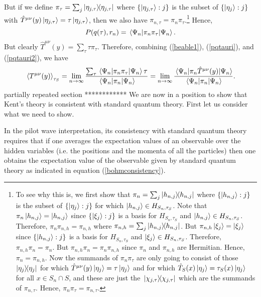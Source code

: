 But if we define $\pi_\tau=\sum_j\dyad{\eta_{j,\tau}}$ where $\{\ket{\eta_{j,\tau}}:j\}$ is the subset of  $\{\ket{\eta_j}:j\}$ with $\hat{T}^{\mu\nu}(y)\ket{\eta_{j,\tau}}=\tau\ket{\eta_{j,\tau}}$, then we also have  $\pi_{n,\tau}=\pi_n\pi_\tau$.\footnote{To see why this is, 
we first show that $\pi_n=\sum_j\dyad{h_{n,j}}$ where $\{\ket{h_{n,j}}:j\}$ is the subset of $\{\ket{\eta_j}:j\}$  for which $\ket{h_{n,j}}\in H_{S_n,\tau_S}$. 
Note that $\pi_n\ket{h_{n,j}}=\ket{h_{n,j}}$    since $\{\ket{\xi_j}:j\}$ is a basis for $H_{S_n,\tau_S}$ and $\ket{h_{n,j}}\in H_{S_n,\tau_S}$. 
Therefore, $\pi_n\pi_{n,h}=\pi_{n,h}$  where  $\pi_{n,h}=\sum_j\dyad{h_{n,j}}$. 
But  $\pi_{n,h}\ket{\xi_j}=\ket{\xi_j}$ since $\{\ket{h_{n,j}}:j\}$ is a basis for $H_{S_n,\tau_S}$ and $\ket{\xi_j}\in H_{S_n,\tau_S}$. 
Therefore, $\pi_{n,h}\pi_n=\pi_n.$ But $\pi_{n,h}\pi_n= \pi_n\pi_{n,h}$ since $\pi_n$ and $\pi_{n,h}$ are Hermitian. Hence, $\pi_n= \pi_{n,h}$. Now the summands of $\pi_n\pi_\tau$ are only going to consist of those $\dyad{\eta_j}$ for which $\hat{T}^{\mu\nu}(y)\ket{\eta_j}=\tau\ket{\eta_j}$ and for which $\hat{T}_S(x)\ket{\eta_j}=\tau_S(x)\ket{\eta_j}$ for all $x\in S_n\cap S$, and these are just the $\dyad*{\chi_{j,\tau}}$ which are the summands of  $\pi_{n,\tau}$. Hence,  $\pi_n\pi_\tau=\pi_{n,\tau}.$} 
  Hence,
\begin{equation}\label{pqtauri2}
P(q(\tau), r_n)=\ev*{\pi_n\pi_\tau}{\Psi_n}.
\end{equation}
But clearly $\hat{T}^{\mu\nu}(y)=\sum_\tau \tau \pi_\tau.$ Therefore, combining (\ref{beable1}), (\ref{pqtauri}), and (\ref{pqtauri2}), we have 
\begin{equation}\label{kentconsistency0}
\ev*{T^{\mu\nu}(y)}_{\tau_S}=\lim_{n\rightarrow\infty}\frac{\sum_\tau \ev*{\pi_n\pi_\tau}{\Psi_n}\tau}{\ev*{\pi_n}{\Psi_n}}=\lim_{n\rightarrow\infty}\frac{\ev*{\pi_n\hat{T}^{\mu\nu}(y)}{\Psi_n}}{\ev*{\pi_n}{\Psi_n}}.
\end{equation}
partially repeated section
************ 
We are now in a position to show that Kent's theory is consistent with standard quantum theory. First let us consider what we need to show. 

In the pilot wave interpretation, its consistency with standard quantum theory requires that if one averages the expectation values of an observable over the hidden variables (i.e. the positions and the momenta of all the particles) then one obtains the expectation value of the observable given by standard quantum theory as indicated in equation (\ref{bohmconsistency}). 

